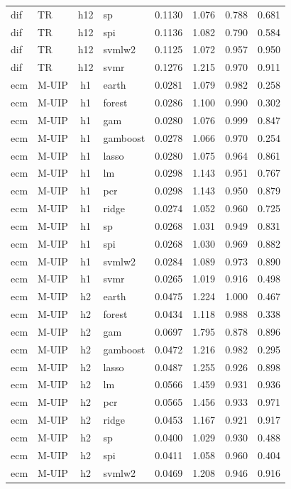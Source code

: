 \begin{ThreePartTable}
\begin{longtable}[t]{llclcccc}
dif & TR & h12 & sp & 0.1130 & 1.076 & 0.788 & 0.681\\
dif & TR & h12 & spi & 0.1136 & 1.082 & 0.790 & 0.584\\
dif & TR & h12 & svmlw2 & 0.1125 & 1.072 & 0.957 & 0.950\\
dif & TR & h12 & svmr & 0.1276 & 1.215 & 0.970 & 0.911\\
\addlinespace
ecm & M-UIP & h1 & earth & 0.0281 & 1.079 & 0.982 & 0.258\\
ecm & M-UIP & h1 & forest & 0.0286 & 1.100 & 0.990 & 0.302\\
ecm & M-UIP & h1 & gam & 0.0280 & 1.076 & 0.999 & 0.847\\
ecm & M-UIP & h1 & gamboost & 0.0278 & 1.066 & 0.970 & 0.254\\
ecm & M-UIP & h1 & lasso & 0.0280 & 1.075 & 0.964 & 0.861\\
ecm & M-UIP & h1 & lm & 0.0298 & 1.143 & 0.951 & 0.767\\
ecm & M-UIP & h1 & pcr & 0.0298 & 1.143 & 0.950 & 0.879\\
ecm & M-UIP & h1 & ridge & 0.0274 & 1.052 & 0.960 & 0.725\\
ecm & M-UIP & h1 & sp & 0.0268 & 1.031 & 0.949 & 0.831\\
ecm & M-UIP & h1 & spi & 0.0268 & 1.030 & 0.969 & 0.882\\
ecm & M-UIP & h1 & svmlw2 & 0.0284 & 1.089 & 0.973 & 0.890\\
ecm & M-UIP & h1 & svmr & 0.0265 & 1.019 & 0.916 & 0.498\\
\addlinespace
ecm & M-UIP & h2 & earth & 0.0475 & 1.224 & 1.000 & 0.467\\
ecm & M-UIP & h2 & forest & 0.0434 & 1.118 & 0.988 & 0.338\\
ecm & M-UIP & h2 & gam & 0.0697 & 1.795 & 0.878 & 0.896\\
ecm & M-UIP & h2 & gamboost & 0.0472 & 1.216 & 0.982 & 0.295\\
ecm & M-UIP & h2 & lasso & 0.0487 & 1.255 & 0.926 & 0.898\\
ecm & M-UIP & h2 & lm & 0.0566 & 1.459 & 0.931 & 0.936\\
ecm & M-UIP & h2 & pcr & 0.0565 & 1.456 & 0.933 & 0.971\\
ecm & M-UIP & h2 & ridge & 0.0453 & 1.167 & 0.921 & 0.917\\
ecm & M-UIP & h2 & sp & 0.0400 & 1.029 & 0.930 & 0.488\\
ecm & M-UIP & h2 & spi & 0.0411 & 1.058 & 0.960 & 0.404\\
ecm & M-UIP & h2 & svmlw2 & 0.0469 & 1.208 & 0.946 & 0.916\\

\end{longtable}
\end{ThreePartTable}
